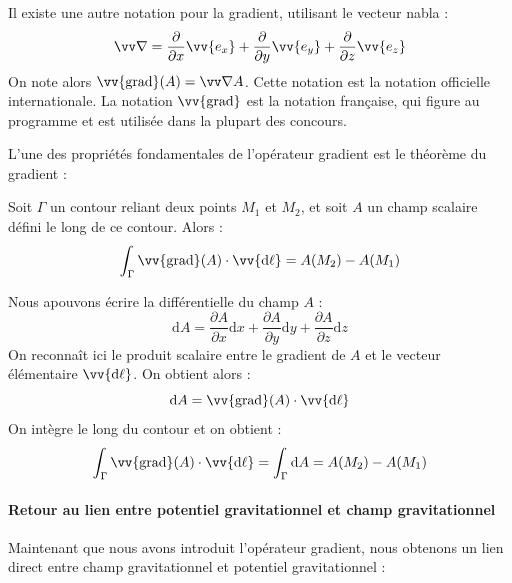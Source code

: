 \documentclass[11pt,fleqn]{book} %
\newcommand{\dd}{\mathrm{d}}
\newcommand{\grad}{\vv{\mathrm{grad}}}
\begin{document}
\begin{remark}
    Il existe une autre notation pour la gradient, utilisant le vecteur nabla :
    \begin{equation}
        \vv \nabla = \frac{\partial}{\partial x} \vv{e_x} + \frac{\partial}{\partial y} \vv{e_y} + \frac{\partial}{\partial z} \vv{e_z}
    \end{equation}
    On note alors $\grad(A) = \vv \nabla A$. Cette notation est la notation officielle internationale. La notation $\grad$ est la notation française, qui figure au programme et est utilisée dans la plupart des concours.
\end{remark}


L'une des propriétés fondamentales de l'opérateur gradient est le théorème du gradient :
\begin{theorem}
    Soit $\Gamma$ un contour reliant deux points $M_1$ et $M_2$, et soit $A$ un champ scalaire défini le long de ce contour. Alors :
    \begin{equation}
        \int_\Gamma \grad(A) \cdot \vv{\dd \ell} = A(M_2) - A(M_1)
    \end{equation}
\end{theorem}

\begin{demonstration}
    Nous apouvons écrire la différentielle du champ $A$ :
    \begin{equation}
        \dd A = \frac{\partial A}{\partial x} \dd x + \frac{\partial A}{\partial y} \dd y + \frac{\partial A}{\partial z} \dd z 
    \end{equation}
    On reconnaît ici le produit scalaire entre le gradient de $A$ et le vecteur élémentaire $\vv{\dd \ell}$. On obtient alors :
    \begin{equation}
        \dd A = \grad(A) \cdot \vv{\dd \ell}
    \end{equation}
    On intègre le long du contour et on obtient :
    \begin{equation}
        \int_\Gamma \grad(A) \cdot \vv{\dd \ell} = \int_\Gamma \dd A = A(M_2) - A(M_1)
    \end{equation}
\end{demonstration}

\paragraph{Retour au lien entre potentiel gravitationnel et champ gravitationnel}

Maintenant que nous avons introduit l'opérateur gradient, nous obtenons un lien direct entre champ gravitationnel et potentiel gravitationnel :
\end{document}
